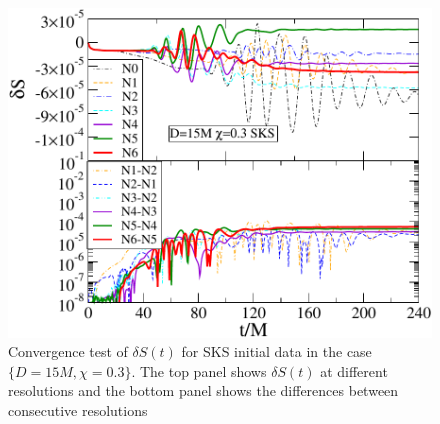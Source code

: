 \begin{figure}
  \includegraphics[width=0.95\columnwidth]{chap5/SKSSConvergence1}
  \caption[Convergence test of $\delta S(t)$ for SKS initial data.]{Convergence test of $\delta S(t)$ for SKS initial data in the case
    $\{D=15M,\chi=0.3\}$. The top panel shows $\delta S(t)$ at different
    resolutions and the bottom panel shows the differences between
    consecutive resolutions}
  \label{fig:SKSSConvergence1}
\end{figure}








